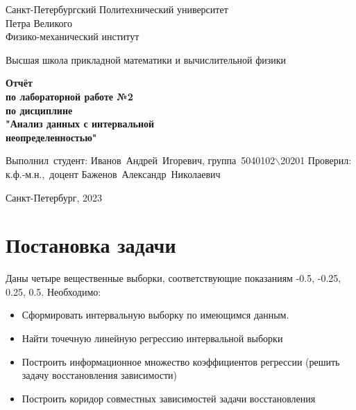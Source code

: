 \documentclass[12pt,a4paper]{article}
\begin{document}
	
	\begin{titlepage}
		
		\begin{center}
			\begin{large}
				Санкт-Петербургский Политехнический университет\\ Петра Великого\\
				Физико-механический институт\\
			\end{large}
			\vspace{0.2cm}
			Высшая школа прикладной математики и вычислительной физики\\
			
		\end{center}
		
		\vspace{3cm}
		\begin{center}
			\textbf{Отчёт\\ по лабораторной работе №2\\ по дисциплине\\ "Анализ данных с интервальной \\неопределенностью"}
		\end{center}
		
		\vspace{3cm}
		
		\vbox{%
			\hfill%
			\vbox{%
				\hbox{Выполнил студент:}%
				\hbox{\break}
				\hbox{Иванов Андрей Игоревич,}%
				\hbox{группа 5040102$\backslash$20201}%
				\hbox{\break}
				\hbox{\break}
				\hbox{Проверил:}
				\hbox{\break}
				\hbox{к.ф.-м.н., доцент}
				\hbox{Баженов Александр Николаевич}
			}%
		} 
		\vfill
		
		\begin{center}
			Санкт-Петербург, 2023
		\end{center}
	
	\end{titlepage}
	\tableofcontents
	\newpage
	
	\listoffigures
	\newpage
	
	\section{Постановка задачи}
            Даны четыре вещественные выборки, соответствующие показаниям -0.5, -0.25, 0.25, 0.5. Необходимо:
            \begin{itemize}
                \item Сформировать интервальную выборку по имеющимся данным.
                \item Найти точечную линейную регрессию интервальной выборки
                \item Построить информационное множество коэффициентов регрессии (решить задачу восстановления зависимости)
                \item Построить коридор совместных зависимостей задачи восстановления
            \end{itemize}
	\newpage
	
\end{document}
